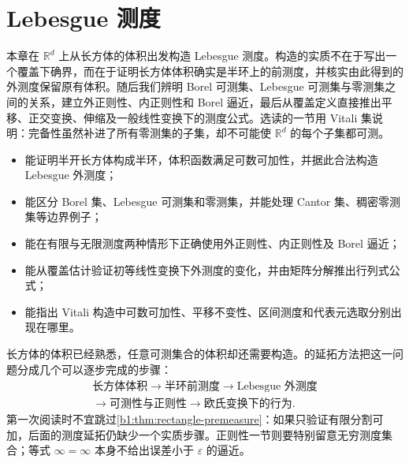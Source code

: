 \chapter{Lebesgue 测度}
\label{b1:ch:03}

\begin{chapterabstract}
本章在 \(\mathbb R^d\) 上从长方体的体积出发构造 Lebesgue 测度。构造的实质不在于写出一个覆盖下确界，而在于证明长方体体积确实是半环上的前测度，并核实由此得到的外测度保留原有体积。随后我们辨明 Borel 可测集、Lebesgue 可测集与零测集之间的关系，建立外正则性、内正则性和 Borel 逼近，最后从覆盖定义直接推出平移、正交变换、伸缩及一般线性变换下的测度公式。选读的一节用 Vitali 集说明：完备性虽然补进了所有零测集的子集，却不可能使 \(\mathbb R^d\) 的每个子集都可测。
\end{chapterabstract}

\begin{learninggoals}
\begin{itemize}
  \item \label{b1:item:0300-goal-1}能证明半开长方体构成半环，体积函数满足可数可加性，并据此合法构造 Lebesgue 外测度；
  \item \label{b1:item:0300-goal-2}能区分 Borel 集、Lebesgue 可测集和零测集，并能处理 Cantor 集、稠密零测集等边界例子；
  \item \label{b1:item:0300-goal-3}能在有限与无限测度两种情形下正确使用外正则性、内正则性及 Borel 逼近；
  \item \label{b1:item:0300-goal-4}能从覆盖估计验证初等线性变换下外测度的变化，并由矩阵分解推出行列式公式；
  \item \label{b1:item:0300-goal-5}能指出 Vitali 构造中可数可加性、平移不变性、区间测度和代表元选取分别出现在哪里。
\end{itemize}
\end{learninggoals}

长方体的体积已经熟悉，任意可测集合的体积却还需要构造。的延拓方法把这一问题分成几个可以逐步完成的步骤：
\[
\begin{gathered}
\text{长方体体积}
\longrightarrow \text{半环前测度}
\longrightarrow \text{Lebesgue 外测度}\\
\longrightarrow \text{可测性与正则性}
\longrightarrow \text{欧氏变换下的行为}.
\end{gathered}
\]
第一次阅读时不宜跳过\cref{b1:thm:rectangle-premeasure}：如果只验证有限分割可加，后面的测度延拓仍缺少一个实质步骤。正则性一节则要特别留意无穷测度集合；等式 \(\infty=\infty\) 本身不给出误差小于 \(\varepsilon\) 的逼近。

